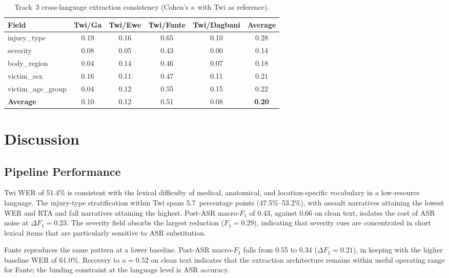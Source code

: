 \documentclass[conference]{IEEEtran}
\begin{document}
\begin{table}[!t]
\caption{Track~3 cross-language extraction consistency
(Cohen's $\kappa$ with Twi as reference).}
\label{tab:kappa}
\centering
\begin{tabular}{lccccc}
\toprule
\textbf{Field}
  & \textbf{Twi/Ga}
  & \textbf{Twi/Ewe}
  & \textbf{Twi/Fante}
  & \textbf{Twi/Dagbani}
  & \textbf{Average} \\
\midrule
injury\_type       & 0.19 & 0.16 & 0.65 & 0.10 & 0.28 \\
severity           & 0.08 & 0.05 & 0.43 & 0.00 & 0.14 \\
body\_region       & 0.04 & 0.14 & 0.46 & 0.07 & 0.18 \\
victim\_sex        & 0.16 & 0.11 & 0.47 & 0.11 & 0.21 \\
victim\_age\_group & 0.04 & 0.12 & 0.55 & 0.15 & 0.22 \\
\midrule
\textbf{Average}   & 0.10 & 0.12 & 0.51 & 0.08 & \textbf{0.20} \\
\bottomrule
\end{tabular}
\end{table}


\section{Discussion}
\label{sec:discussion}

\subsection{Pipeline Performance}

Twi WER of 51.4\% is consistent with the lexical difficulty of
medical, anatomical, and location-specific vocabulary in a
low-resource language. The injury-type stratification within Twi
spans 5.7~percentage points (47.5\%--53.2\%), with assault narratives
attaining the lowest WER and RTA and fall narratives attaining the
highest. Post-ASR macro-$F_{1}$ of 0.43, against 0.66 on clean
text, isolates the cost of ASR noise at $\Delta F_{1} = 0.23$. The
severity field absorbs the largest reduction
($F_{1} = 0.29$), indicating that severity cues are concentrated in
short lexical items that are particularly sensitive to ASR
substitution.

Fante reproduces the same pattern at a lower baseline. Post-ASR
macro-$F_{1}$ falls from 0.55 to 0.34 ($\Delta F_{1} = 0.21$), in
keeping with the higher baseline WER of 61.0\%. Recovery to
$\kappa = 0.52$ on clean text indicates that the extraction
architecture remains within useful operating range for Fante; the
binding constraint at the language level is ASR accuracy.
\end{document}
